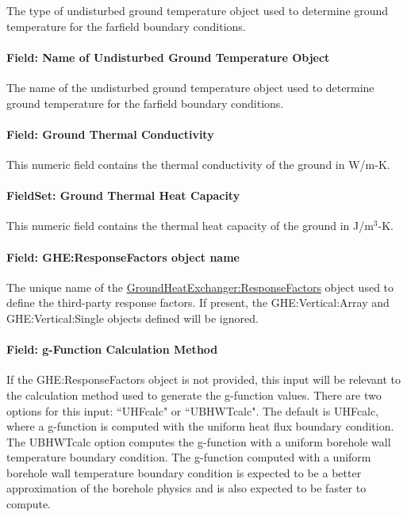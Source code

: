 The type of undisturbed ground temperature object used to determine ground temperature for the farfield boundary conditions.

\paragraph{Field: Name of Undisturbed Ground Temperature Object}\label{field-name-of-undisturbed-ground-temperature-object}

The name of the undisturbed ground temperature object used to determine ground temperature for the farfield boundary conditions.

\paragraph{Field: Ground Thermal Conductivity}\label{field-ground-thermal-conductivity}

This numeric field contains the thermal conductivity of the ground in W/m-K.

\paragraph{FieldSet: Ground Thermal Heat Capacity}\label{fieldset-ground-thermal-heat-capacity}

This numeric field contains the thermal heat capacity of the ground in J/m\(^{3}\)-K.

\paragraph{Field: GHE:ResponseFactors object name}

The unique name of the \hyperref[groundheatexchangerresponsefactors]{GroundHeatExchanger:ResponseFactors} object used to define the third-party response factors. If present, the GHE:Vertical:Array and GHE:Vertical:Single objects defined will be ignored.

\paragraph{Field: g-Function Calculation Method}

If the GHE:ResponseFactors object is not provided, this input will be relevant to the calculation method used to generate the g-function values. There are two options for this input: ``UHFcalc" or ``UBHWTcalc". The default is UHFcalc, where a g-function is computed with the uniform heat flux boundary condition. The UBHWTcalc option computes the g-function with a uniform borehole wall temperature boundary condition. The g-function computed with a uniform borehole wall temperature boundary condition is expected to be a better approximation of the borehole physics and is also expected to be faster to compute.

